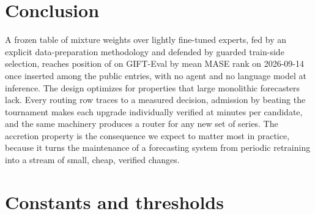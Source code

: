 \documentclass[11pt]{article}
\begin{document}
\section{Conclusion}
\label{sec:conclusion}

A frozen table of mixture weights over lightly fine-tuned experts, fed by
an explicit data-preparation methodology and defended by guarded
train-side selection, reaches position \ourPos{} of \nEntries{} on
GIFT-Eval by mean MASE rank on 2026-09-14 once inserted among the
\nPublic{} public entries, with no agent and no language model at inference.
The design optimizes for properties that large monolithic forecasters
lack. Every routing row traces to a measured decision, admission by
beating the tournament makes each upgrade individually verified at minutes
per candidate, and the same machinery produces a router for any new set of
series. The accretion property is the consequence we expect to matter
most in practice, because it turns the maintenance of a forecasting system
from periodic retraining into a stream of small, cheap, verified changes.




\appendix

\section{Constants and thresholds}
\label{app:constants}
\end{document}
